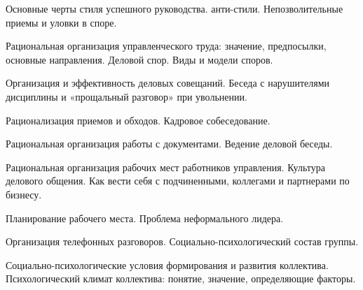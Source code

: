 \documentclass[
	14pt,
	a4paper,
	]
	{scrartcl}
\begin{document}
\vfill

\newpage


\shapk
{}
\setcounter{zad}{0}

\vfill
\z Основные черты стиля успешного руководства. анти-стили.
 \vfill
\z Непозволительные приемы и уловки в споре.
 \vfill

\vfill

\newpage


\shapk
{}
\setcounter{zad}{0}

\vfill
\z Рациональная организация управленческого труда: значение, предпосылки, основные направления.
 \vfill
\z Деловой спор. Виды и модели споров.
 \vfill

\vfill

\newpage


\shapk
{}
\setcounter{zad}{0}

\vfill
\z Организация и эффективность деловых совещаний.
 \vfill
\z Беседа с нарушителями дисциплины и «прощальный разговор» при увольнении.
 \vfill

\vfill

\newpage


\shapk
{}
\setcounter{zad}{0}

\vfill
\z Рационализация приемов и обходов.
 \vfill
\z Кадровое собеседование.
 \vfill

\vfill

\newpage


\shapk
{}
\setcounter{zad}{0}

\vfill
\z Рациональная организация работы с документами.
 \vfill
\z Ведение деловой беседы.
 \vfill

\vfill

\newpage


\shapk
{}
\setcounter{zad}{0}

\vfill
\z Рациональная организация рабочих мест работников управления.
 \vfill
\z Культура делового общения. Как вести себя с подчиненными, коллегами и партнерами по бизнесу.
 \vfill

\vfill

\newpage


\shapk
{}
\setcounter{zad}{0}

\vfill
\z Планирование рабочего места.
 \vfill
\z Проблема неформального лидера.
 \vfill

\vfill

\newpage


\shapk
{}
\setcounter{zad}{0}

\vfill
\z Организация телефонных разговоров.
 \vfill
\z Социально-психологический состав группы.
 \vfill

\vfill

\newpage


\shapk
{}
\setcounter{zad}{0}

\vfill
\z Социально-психологические условия формирования и развития коллектива.
 \vfill
\z Психологический климат коллектива: понятие, значение, определяющие факторы.
 \vfill

\vfill

\newpage
\end{document}
